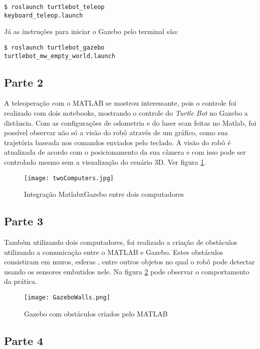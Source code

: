 \documentclass[conference]{ieeeconf}
\begin{document}
\begin{verbatim}
$ roslaunch turtlebot_teleop 
keyboard_teleop.launch
\end{verbatim}

Já as instruções para iniciar o Gazebo pelo terminal são:

\begin{verbatim}
$ roslaunch turtlebot_gazebo 
turtlebot_mw_empty_world.launch
\end{verbatim}


\subsection{Parte 2}

A teleoperação com o MATLAB se mostrou interessante, pois o controle foi realizado com dois notebooks, mostrando o controle do \textit{Turtle Bot} no Gazebo a distância. Com as configurações de odometria e do laser scan feitas no Matlab, foi possível observar não só a visão do robô através de um gráfico, como sua trajetória baseada nos comandos enviados pelo teclado. A visão do robô é atualizada de acordo com o posicionamento da sua câmera e com isso pode ser controlado mesmo sem a visualização do cenário 3D. Ver figura \ref{fig:twoComputers}.

\begin{figure}[!htb]
\centering
\texttt{[image: twoComputers.jpg]}
\caption{Integração MatlabxGazebo entre dois computadores}
\label{fig:twoComputers}
\end{figure}
 
\subsection{Parte 3}

Também utilizando dois computadores, foi realizado a criação de obstáculos utilizando a comunicação entre o MATLAB e Gazebo. Estes obstáculos consistiram em muros, esferas , entre outros objetos no qual o robô pode detectar usando os sensores embutidos nele. Na figura \ref{fig:GazeboWalls} pode observar o comportamento da prática.

\begin{figure}[!htb]
\centering
\texttt{[image: GazeboWalls.png]}
\caption{Gazebo com obstáculos criados pelo MATLAB}
\label{fig:GazeboWalls}
\end{figure}

\newpage

\subsection{Parte 4}
\end{document}
